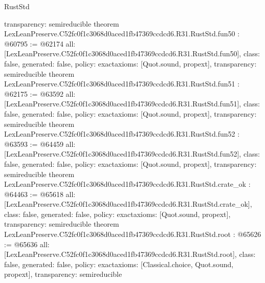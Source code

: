 \begin{lexlean}{RustStd}
\begin{coremodule}
{  transparency: semireducible
}
theorem LexLeanPreserve.C52fc0f1c3068d0aced1fb47369ccdcd6.R31.RustStd.fun50 : @60795 := @62174 {
  all: [LexLeanPreserve.C52fc0f1c3068d0aced1fb47369ccdcd6.R31.RustStd.fun50],
  class: false,
  generated: false,
  policy: exact{axioms: [Quot.sound, propext]},
  transparency: semireducible
}
theorem LexLeanPreserve.C52fc0f1c3068d0aced1fb47369ccdcd6.R31.RustStd.fun51 : @62175 := @63592 {
  all: [LexLeanPreserve.C52fc0f1c3068d0aced1fb47369ccdcd6.R31.RustStd.fun51],
  class: false,
  generated: false,
  policy: exact{axioms: [Quot.sound, propext]},
  transparency: semireducible
}
theorem LexLeanPreserve.C52fc0f1c3068d0aced1fb47369ccdcd6.R31.RustStd.fun52 : @63593 := @64459 {
  all: [LexLeanPreserve.C52fc0f1c3068d0aced1fb47369ccdcd6.R31.RustStd.fun52],
  class: false,
  generated: false,
  policy: exact{axioms: [Quot.sound, propext]},
  transparency: semireducible
}
theorem LexLeanPreserve.C52fc0f1c3068d0aced1fb47369ccdcd6.R31.RustStd.crate_ok : @64463 := @65618 {
  all: [LexLeanPreserve.C52fc0f1c3068d0aced1fb47369ccdcd6.R31.RustStd.crate_ok],
  class: false,
  generated: false,
  policy: exact{axioms: [Quot.sound, propext]},
  transparency: semireducible
}
theorem LexLeanPreserve.C52fc0f1c3068d0aced1fb47369ccdcd6.R31.RustStd.root : @65626 := @65636 {
  all: [LexLeanPreserve.C52fc0f1c3068d0aced1fb47369ccdcd6.R31.RustStd.root],
  class: false,
  generated: false,
  policy: exact{axioms: [Classical.choice, Quot.sound, propext]},
  transparency: semireducible
}


\end{coremodule}
\end{lexlean}
